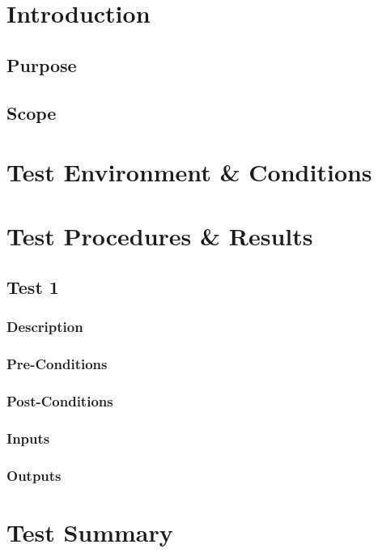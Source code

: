 \section{Introduction}
\subsection{Purpose}
\subsection{Scope}

\section{Test Environment \& Conditions}


\section{Test Procedures \& Results}

\subsection{Test 1}
\subsubsection{Description}
\subsubsection{Pre-Conditions}
\subsubsection{Post-Conditions}
\subsubsection{Inputs}
\subsubsection{Outputs}


\section{Test Summary}
